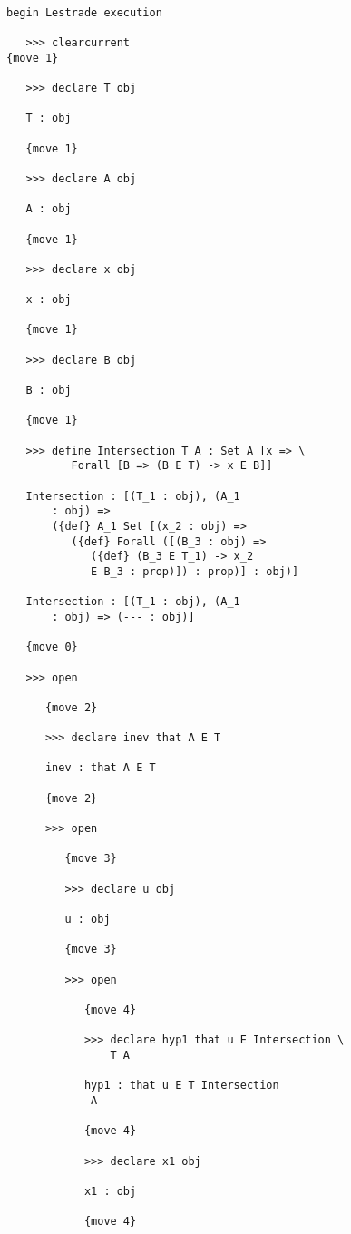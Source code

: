 \documentclass[12pt]{article}
\begin{document}
\begin{verbatim}

begin Lestrade execution

   >>> clearcurrent
{move 1}

   >>> declare T obj

   T : obj

   {move 1}

   >>> declare A obj

   A : obj

   {move 1}

   >>> declare x obj

   x : obj

   {move 1}

   >>> declare B obj

   B : obj

   {move 1}

   >>> define Intersection T A : Set A [x => \
          Forall [B => (B E T) -> x E B]]

   Intersection : [(T_1 : obj), (A_1 
       : obj) => 
       ({def} A_1 Set [(x_2 : obj) => 
          ({def} Forall ([(B_3 : obj) => 
             ({def} (B_3 E T_1) -> x_2 
             E B_3 : prop)]) : prop)] : obj)]

   Intersection : [(T_1 : obj), (A_1 
       : obj) => (--- : obj)]

   {move 0}

   >>> open

      {move 2}

      >>> declare inev that A E T

      inev : that A E T

      {move 2}

      >>> open

         {move 3}

         >>> declare u obj

         u : obj

         {move 3}

         >>> open

            {move 4}

            >>> declare hyp1 that u E Intersection \
                T A

            hyp1 : that u E T Intersection 
             A

            {move 4}

            >>> declare x1 obj

            x1 : obj

            {move 4}


\end{verbatim}
\end{document}

